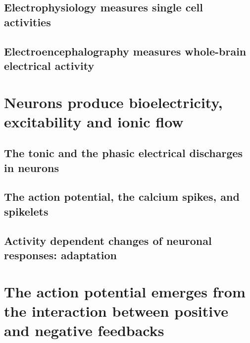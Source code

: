 \subsection{Electrophysiology measures single cell activities}
\subsection{Electroencephalography measures whole-brain electrical activity}


\section{Neurons produce bioelectricity, excitability and ionic flow}
\subsection{The tonic and the phasic electrical discharges in neurons}
\subsection{The action potential, the calcium spikes, and spikelets}
\subsection{Activity dependent changes of neuronal responses: adaptation}

\section{The action potential emerges from the interaction between positive and negative feedbacks}

